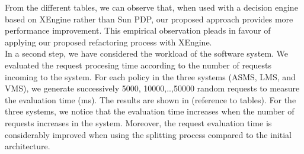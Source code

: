 From the different tables, we can observe that, when used with a decision engine based on XEngine rather than Sun PDP, our proposed approach provides more performance improvement. 
This empirical observation pleads in favour of applying our proposed refactoring process with XEngine.\\

In a second step, we have considered the workload of the software system. We evaluated the request procesing time according to the number of requests incoming to the system. 
For each policy in the three systems (ASMS, LMS, and VMS), we generate successively 5000, 10000,..,50000 random requests to measure the evaluation time (ms).
The results are shown in (reference to tables). For the three systems, we notice that the evaluation time increases when the number of requests increases in the system. 
Moreover, the request evaluation time is considerably improved when using the splitting process compared to the initial architecture.

